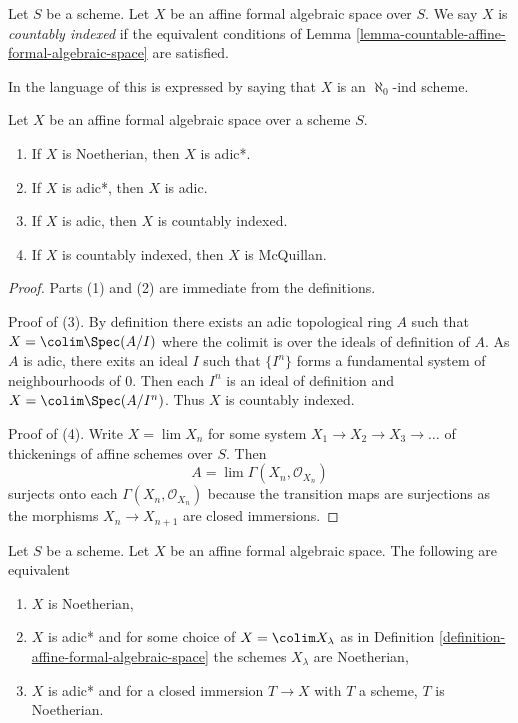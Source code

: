 \begin{definition}
\label{definition-countable}
Let $S$ be a scheme. Let $X$ be an affine formal algebraic space over $S$.
We say $X$ is {\it countably indexed} if the equivalent conditions of
Lemma \ref{lemma-countable-affine-formal-algebraic-space} are satisfied.
\end{definition}

\noindent
In the language of \cite{BVGD} this is expressed by saying that
$X$ is an $\aleph_0$-ind scheme.

\begin{lemma}
\label{lemma-implications-between-types}
Let $X$ be an affine formal algebraic space over a scheme $S$.
\begin{enumerate}
\item If $X$ is Noetherian, then $X$ is adic*.
\item If $X$ is adic*, then $X$ is adic.
\item If $X$ is adic, then $X$ is countably indexed.
\item If $X$ is countably indexed, then $X$ is McQuillan.
\end{enumerate}
\end{lemma}

\begin{proof}
Parts (1) and (2) are immediate from the definitions.

\medskip\noindent
Proof of (3). By definition there exists an adic topological ring $A$
such that $X = \colim \Spec(A/I)$ where the colimit is over the ideals
of definition of $A$. As $A$ is adic, there exits an ideal $I$
such that $\{I^n\}$ forms a fundamental system of neighbourhoods of $0$.
Then each $I^n$ is an ideal of definition and $X = \colim \Spec(A/I^n)$.
Thus $X$ is countably indexed.

\medskip\noindent
Proof of (4). Write $X = \lim X_n$
for some system $X_1 \to X_2 \to X_3 \to \ldots$ of thickenings of affine
schemes over $S$. Then
$$
A = \lim \Gamma(X_n, \mathcal{O}_{X_n})
$$
surjects onto each $\Gamma(X_n, \mathcal{O}_{X_n})$ because the transition
maps are surjections as the morphisms $X_n \to X_{n + 1}$ are closed
immersions.
\end{proof}

\begin{lemma}
\label{lemma-characterize-noetherian-affine}
Let $S$ be a scheme. Let $X$ be an affine formal algebraic space.
The following are equivalent
\begin{enumerate}
\item $X$ is Noetherian,
\item $X$ is adic* and for some choice of $X = \colim X_\lambda$ as in
Definition \ref{definition-affine-formal-algebraic-space}
the schemes $X_\lambda$ are Noetherian,
\item $X$ is adic* and for a closed immersion $T \to X$ with $T$
a scheme, $T$ is Noetherian.
\end{enumerate}
\end{lemma}

